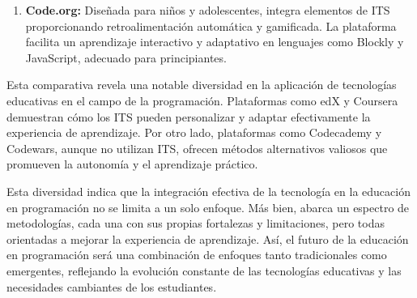 \begin{enumerate}
    \item \textbf{Code.org:} Diseñada para niños y adolescentes, integra elementos de ITS proporcionando retroalimentación automática y gamificada. La plataforma facilita un aprendizaje interactivo y adaptativo en lenguajes como Blockly y JavaScript, adecuado para principiantes.
\end{enumerate}

Esta comparativa revela una notable diversidad en la aplicación de tecnologías educativas en el campo de la programación. Plataformas como edX y Coursera demuestran cómo los ITS pueden personalizar y adaptar efectivamente la experiencia de aprendizaje. Por otro lado, plataformas como Codecademy y Codewars, aunque no utilizan ITS, ofrecen métodos alternativos valiosos que promueven la autonomía y el aprendizaje práctico.

Esta diversidad indica que la integración efectiva de la tecnología en la educación en programación no se limita a un solo enfoque. Más bien, abarca un espectro de metodologías, cada una con sus propias fortalezas y limitaciones, pero todas orientadas a mejorar la experiencia de aprendizaje. Así, el futuro de la educación en programación será una combinación de enfoques tanto tradicionales como emergentes, reflejando la evolución constante de las tecnologías educativas y las necesidades cambiantes de los estudiantes.